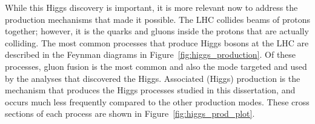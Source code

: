 While this Higgs discovery is important, it is more relevant now to address the production mechanisms that made it possible. The LHC collides beams of protons together;
however, it is the quarks and gluons inside the protons that are actually colliding. The most common processes that produce Higgs bosons at the LHC are described in the
Feynman diagrams in Figure~\ref{fig:higgs_production}. Of these processes, gluon fusion is the most common and also the mode targeted and used by the analyses that
discovered the Higgs. Associated (Higgs) production is the mechanism that produces the Higgs processes studied in this dissertation, and occurs much less frequently compared to
the other production modes. These cross sections of each process are shown in Figure~\ref{fig:higgs_prod_plot}.


\begin{figure}[htbp] 
  {\centering
    \\
    \\

}
\end{figure}
